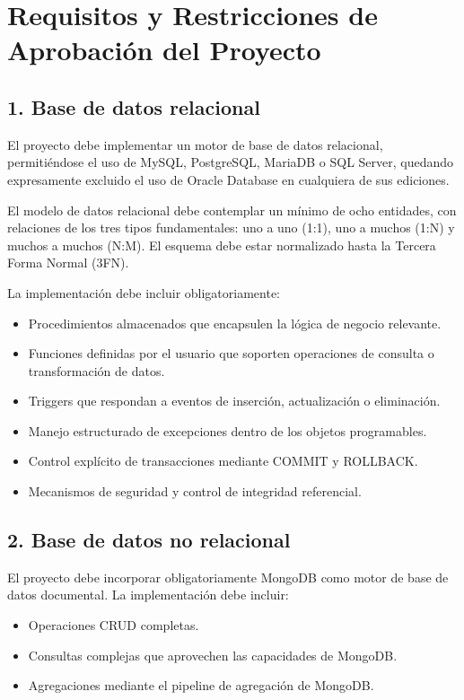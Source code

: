 \documentclass[12pt, a4paper]{article}
\begin{document}
\section{Requisitos y Restricciones de Aprobación del Proyecto}

\subsection*{1. Base de datos relacional}

El proyecto debe implementar un motor de base de datos relacional, permitiéndose el uso de MySQL, PostgreSQL, MariaDB o SQL Server, quedando expresamente excluido el uso de Oracle Database en cualquiera de sus ediciones.

El modelo de datos relacional debe contemplar un mínimo de ocho entidades, con relaciones de los tres tipos fundamentales: uno a uno (1:1), uno a muchos (1:N) y muchos a muchos (N:M). El esquema debe estar normalizado hasta la Tercera Forma Normal (3FN).

La implementación debe incluir obligatoriamente:

\begin{itemize}[leftmargin=2cm]
    \item Procedimientos almacenados que encapsulen la lógica de negocio relevante.
    \item Funciones definidas por el usuario que soporten operaciones de consulta o transformación de datos.
    \item Triggers que respondan a eventos de inserción, actualización o eliminación.
    \item Manejo estructurado de excepciones dentro de los objetos programables.
    \item Control explícito de transacciones mediante COMMIT y ROLLBACK.
    \item Mecanismos de seguridad y control de integridad referencial.
\end{itemize}

\subsection*{2. Base de datos no relacional}

El proyecto debe incorporar obligatoriamente MongoDB como motor de base de datos documental. La implementación debe incluir:

\begin{itemize}[leftmargin=2cm]
    \item Operaciones CRUD completas.
    \item Consultas complejas que aprovechen las capacidades de MongoDB.
    \item Agregaciones mediante el pipeline de agregación de MongoDB.
\end{itemize}
\end{document}
